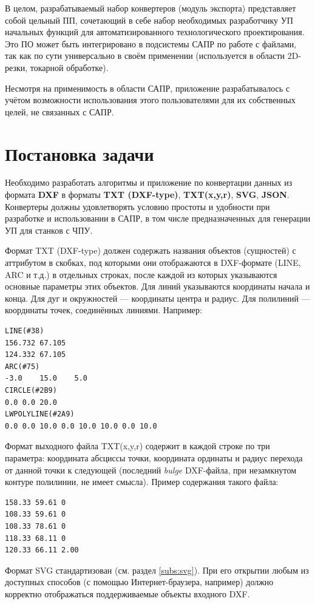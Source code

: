 В целом, разрабатываемый набор конвертеров (модуль экспорта) представляет собой цельный ПП, сочетающий в себе набор необходимых разработчику УП начальных функций для автоматизированного технологического проектирования. Это ПО может быть интегрировано в подсистемы САПР по работе с файлами, так как по сути универсально в своём применении (используется в области 2D-резки, токарной обработке).

Несмотря на применимость в области САПР, приложение разрабатывалось с учётом возможности использования этого пользователями для их собственных целей, не связанных с САПР.


\section{Постановка задачи} \label{sec:aufgabe}

Необходимо разработать алгоритмы и приложение по конвертации данных из формата \textbf{DXF} в форматы \textbf{TXT (DXF-type)}, \textbf{TXT(x,y,r)}, \textbf{SVG}, \textbf{JSON}. Конвертеры должны удовлетворять условию простоты и удобности при разработке и использовании в САПР, в том числе предназначенных для генерации УП для станков с ЧПУ.

Формат TXT (DXF-type) должен содержать названия объектов (сущностей) с аттрибутом в скобках, под которыми они отображаются в DXF-формате (LINE, ARC и т.д.) в отдельных строках, после каждой из которых указываются основные параметры этих объектов. Для линий указываются координаты начала и конца. Для дуг и окружностей --- координаты центра и радиус. Для полилиний --- координаты точек, соединённых линиями. Например:
\begin{lstlisting}[label=list:dxftxtscheme]
LINE(#38)
156.732	67.105
124.332	67.105
ARC(#75)
-3.0	15.0	5.0
CIRCLE(#2B9)
0.0 0.0 20.0
LWPOLYLINE(#2A9)
0.0 0.0 10.0 0.0 10.0 10.0 0.0 10.0 
\end{lstlisting}

Формат выходного файла TXT(x,y,r) содержит в каждой строке по три параметра: координата абсциссы точки, координата ординаты и радиус перехода от данной точки к следующей (последний \textit{bulge} DXF-файла, при незамкнутом контуре полилинии, не имеет смысла). Пример содержания такого файла:
\begin{lstlisting}[label=list:dxftxtscheme]
158.33 59.61 0
108.33 59.61 0
108.33 78.61 0
118.33 68.11 0
120.33 66.11 2.00
\end{lstlisting}

Формат SVG стандартизован (см. раздел \ref{subs:svg}). При его открытии любым из доступных способов (с помощью Интернет-браузера, например) должно корректно отображаться поддерживаемые объекты входного DXF.

